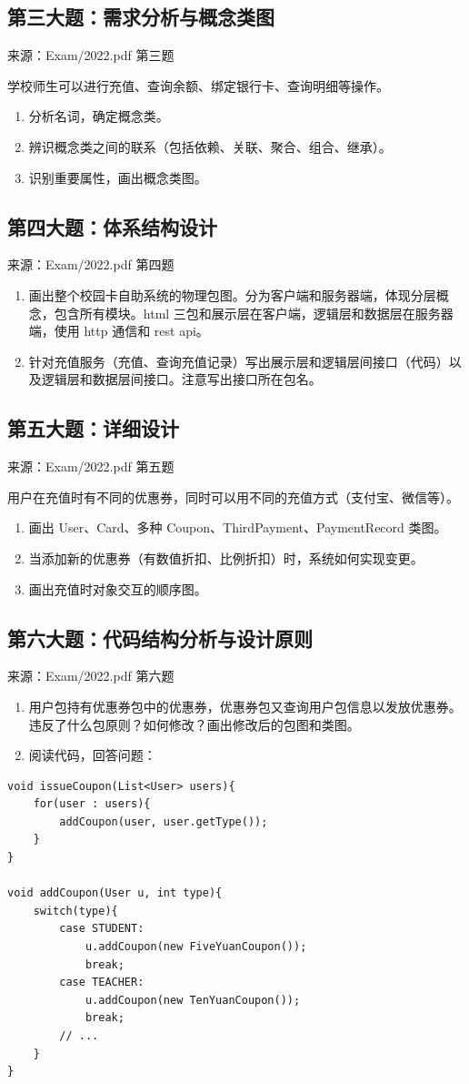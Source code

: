 \documentclass[UTF8,zihao=-4]{ctexart}
\newcommand{\qtitle}[2]{%
  \subsection*{#1}
  {\small\color{TextGray}来源：#2}\par
}
\begin{document}
\qtitle{第三大题：需求分析与概念类图}{Exam/2022.pdf 第三题}
学校师生可以进行充值、查询余额、绑定银行卡、查询明细等操作。
\begin{enumerate}
  \item 分析名词，确定概念类。
  \item 辨识概念类之间的联系（包括依赖、关联、聚合、组合、继承）。
  \item 识别重要属性，画出概念类图。
\end{enumerate}

\qtitle{第四大题：体系结构设计}{Exam/2022.pdf 第四题}
\begin{enumerate}
  \item 画出整个校园卡自助系统的物理包图。分为客户端和服务器端，体现分层概念，包含所有模块。html 三包和展示层在客户端，逻辑层和数据层在服务器端，使用 http 通信和 rest api。
  \item 针对充值服务（充值、查询充值记录）写出展示层和逻辑层间接口（代码）以及逻辑层和数据层间接口。注意写出接口所在包名。
\end{enumerate}

\qtitle{第五大题：详细设计}{Exam/2022.pdf 第五题}
用户在充值时有不同的优惠券，同时可以用不同的充值方式（支付宝、微信等）。
\begin{enumerate}
  \item 画出 User、Card、多种 Coupon、ThirdPayment、PaymentRecord 类图。
  \item 当添加新的优惠券（有数值折扣、比例折扣）时，系统如何实现变更。
  \item 画出充值时对象交互的顺序图。
\end{enumerate}

\qtitle{第六大题：代码结构分析与设计原则}{Exam/2022.pdf 第六题}
\begin{enumerate}
  \item 用户包持有优惠券包中的优惠券，优惠券包又查询用户包信息以发放优惠券。违反了什么包原则？如何修改？画出修改后的包图和类图。
  \item 阅读代码，回答问题：
\end{enumerate}

\begin{verbatim}
void issueCoupon(List<User> users){
    for(user : users){
        addCoupon(user, user.getType());
    }
}

void addCoupon(User u, int type){
    switch(type){
        case STUDENT:
            u.addCoupon(new FiveYuanCoupon());
            break;
        case TEACHER:
            u.addCoupon(new TenYuanCoupon());
            break;
        // ...
    }
}
\end{verbatim}
\end{document}
